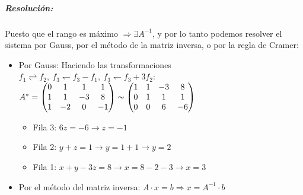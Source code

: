\subparagraph{Resolución:} Puesto que el rango es máximo $\Rightarrow \exists A^{-1}$, y por lo tanto podemos resolver el sistema por Gauss, por el método de la matriz inversa, o por la regla de Cramer:
\begin{itemize}
    \item Por Gauss:
    Haciendo las transformaciones $f_1 \rightleftharpoons f_2 , \ f_3\leftharpoondown f_3-f_1, \  f_3\leftharpoondown f_3+3f_2$:\\
    $A^*=\left(\begin{matrix}0 & 1 & 1 & 1\\1 & 1 & -3 & 8\\1 & -2 & 0 & -1\end{matrix}\right)\thicksim
    \left(\begin{matrix}1 & 1 & -3 & 8\\0 & 1 & 1 & 1\\0 & 0 & 6 & -6\end{matrix}\right)$
    \begin{itemize}
        \item Fila 3: $6z = -6 \to z = -1$
        \item Fila 2: $y+z=1 \to y = 1+1 \to y=2$
        \item Fila 1: $x+y-3z=8 \to x=8-2-3 \to x=3$
    \end{itemize}
    \item Por el método del matriz inversa: $A\cdot x=b \Rightarrow x=A^{-1}\cdot b$
    

\end{itemize}

